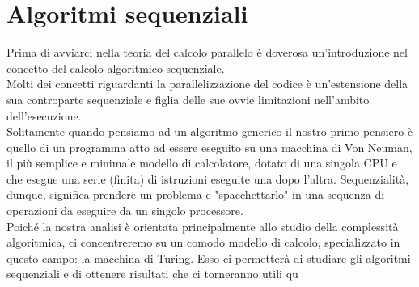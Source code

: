 \chapter{Algoritmi sequenziali}
Prima di avviarci nella teoria del calcolo parallelo è doverosa un'introduzione nel concetto del calcolo algoritmico sequenziale.\\
Molti dei concetti riguardanti la parallelizzazione del codice è un'estensione della sua controparte sequenziale e figlia delle sue ovvie limitazioni nell'ambito dell'esecuzione.\cite{Placeholder}\\
Solitamente quando pensiamo ad un algoritmo generico il nostro primo pensiero è quello di un programma atto ad essere eseguito su una macchina di Von Neuman, il più semplice e minimale modello di calcolatore, dotato di una singola CPU e che esegue una serie (finita) di istruzioni eseguite una dopo l'altra. Sequenzialità, dunque, significa prendere un problema e "spacchettarlo" in una sequenza di operazioni da eseguire da un singolo processore.\\
Poiché la nostra analisi è orientata principalmente allo studio della complessità algoritmica, ci concentreremo su un comodo modello di calcolo, specializzato in questo campo: la macchina di Turing. Esso ci permetterà di studiare gli algoritmi sequenziali e di ottenere risultati che ci torneranno utili qu
